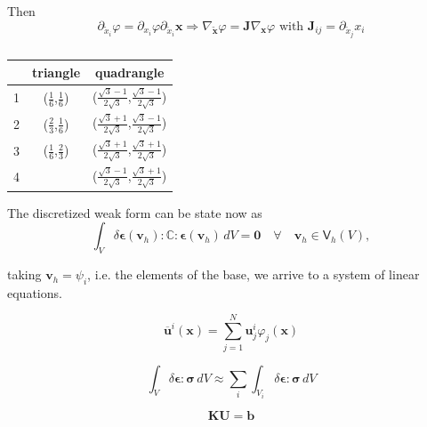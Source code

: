 \documentclass[review]{elsarticle}
\begin{document}
Then
\begin{equation}
\partial_{\tilde{x}_i} \varphi =
\partial_{x_i} \varphi
\partial_{\tilde{x}_i} \bm{x} 
\Rightarrow 
\nabla_{\tilde{\bm{x}}} \varphi =
\bm{J}
\nabla_{\bm{x}} \varphi \text{ with }
\bm{J}_{ij} = 
\partial_{\tilde{x}_j} x_i 
\end{equation}



\begin{table}[ht]
\centering
\begin{tabular}{ | c | c | c | }
\hline
& triangle & quadrangle \\ 
\hline
1 &($\frac{1}{6}$,$\frac{1}{6}$)& ($\frac{\sqrt{3}-1}{2\sqrt{3}}$,$\frac{\sqrt{3}-1}{2\sqrt{3}}$)\\
2 &($\frac{2}{3}$,$\frac{1}{6}$)& ($\frac{\sqrt{3}+1}{2\sqrt{3}}$,$\frac{\sqrt{3}-1}{2\sqrt{3}}$)\\
3 &($\frac{1}{6}$,$\frac{2}{3}$)& ($\frac{\sqrt{3}+1}{2\sqrt{3}}$,$\frac{\sqrt{3}+1}{2\sqrt{3}}$)\\
4 &                             & ($\frac{\sqrt{3}-1}{2\sqrt{3}}$,$\frac{\sqrt{3}+1}{2\sqrt{3}}$)\\
\hline 
\end{tabular}
\caption{\label{tab:gauss}}
\end{table}


The discretized weak form can be state now as
\begin{equation}
\int_V \delta \bm{\epsilon}(\bm{v}_h) : \mathbb{C} : \bm{\epsilon}(\bm{v}_h) \,dV = \bm{0}
\quad \forall \quad \bm{v}_h \in \bm{\mathsf{V}}_h(V),
\end{equation}

\noindent
taking $\bm{v}_h = \psi_i$, i.e. the elements of the base, we
arrive to a system of linear equations.

\begin{equation}
\overline{\bm{u}}^i(\bm{x}) = 
\sum_{j=1}^N \bm{u}_j^i \varphi_j (\bm{x})
\end{equation}

\begin{equation}
\int_V \delta \bm{\epsilon}:\bm{\sigma} \,dV
\approx
\sum_i \int_{V_i} \delta \bm{\epsilon}:\bm{\sigma} \,dV
\end{equation}

\begin{equation}
\bm{K}\bm{U} = \bm{b}
\label{eq:equil_matricial}
\end{equation}
\end{document}
